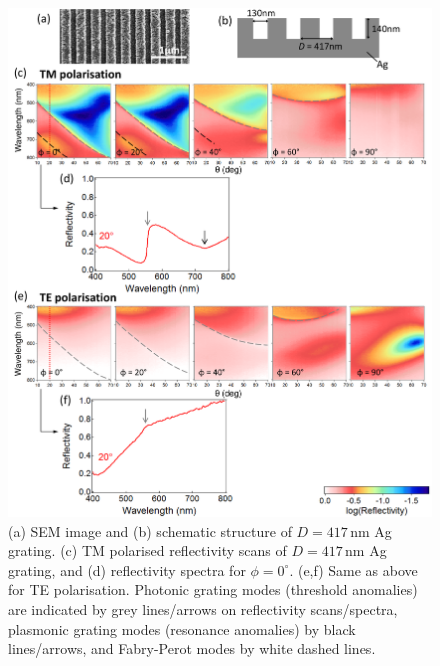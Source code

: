 \begin{figure}[h!] 
\centering    
\includegraphics[width=\textwidth]{Fig8}
\caption[(a) SEM image and (b) schematic structure of $D=417$\,nm Ag grating. Reflectivity measurements of Ag grating in (c,d) TM and (e.f) TE polarisation.]{(a) SEM image and (b) schematic structure of $D=417$\,nm Ag grating. (c) TM polarised reflectivity scans of $D=417$\,nm Ag grating, and (d) reflectivity spectra for $\phi=0^{\circ}$. (e,f) Same as above for TE polarisation. Photonic grating modes (threshold anomalies) are indicated by grey lines/arrows on reflectivity scans/spectra, plasmonic grating modes (resonance anomalies) by black lines/arrows, and Fabry-Perot modes by white dashed lines.}
\label{7Fig8}
\end{figure}

